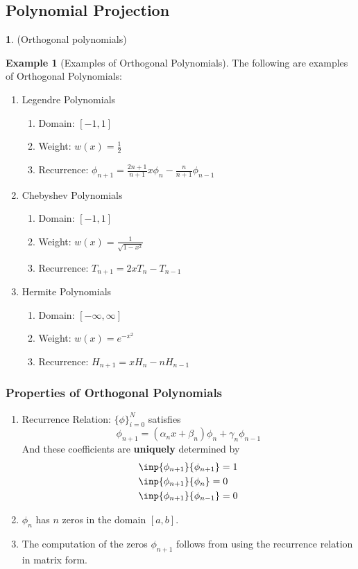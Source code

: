 \documentclass[12pt]{article}
\theoremstyle{definition}
\newtheorem{definition}{\color{NavyBlue}{\textbf{Definition}}}
\newtheorem{example}{\color{WildStrawberry}Example}
\theoremstyle{definition}
\begin{document}
\subsection{Polynomial Projection}

\begin{definition}(Orthogonal polynomials)
	
\end{definition}

\begin{example}[Examples of Orthogonal Polynomials]
The following are examples of Orthogonal Polynomials:
\begin{enumerate}
	\item Legendre Polynomials
	\begin{enumerate}
		\item Domain: $[-1,1]$
		\item Weight: $w(x) = \frac{1}{2}$
		\item Recurrence: $\phi_{n+1} = \frac{2n+1}{n+1}x\phi_n - \frac{n}{n+1}\phi_{n-1}$
	\end{enumerate}
	\item Chebyshev Polynomials
	\begin{enumerate}
		\item Domain: $[-1,1]$
		\item Weight: $w(x) = \frac{1}{\sqrt{1-x^2}}$
		\item Recurrence: $T_{n+1} = 2x T_n - T_{n-1}$
	\end{enumerate}
	\item Hermite Polynomials
	\begin{enumerate}
		\item Domain: $[-\infty,\infty]$
		\item Weight: $w(x) = e^{-x^2}$
		\item Recurrence: $H_{n+1} = xH_n - nH_{n-1}$
	\end{enumerate}
\end{enumerate}
\end{example}

\subsubsection{Properties of Orthogonal Polynomials}
\begin{enumerate}
	\item Recurrence Relation: $\{\phi\}_{i=0}^N$ satisfies
	\begin{equation}
		\phi_{n+1} = (\alpha_n x + \beta_n)\phi_n + \gamma_n \phi_{n-1}
	\end{equation}
	And these coefficients are \textbf{uniquely} determined by 
	\begin{align*}
		&\inp{\phi_{n+1}}{\phi_{n+1}} = 1 \\
		&\inp{\phi_{n+1}}{\phi_{n}} = 0 \\
		&\inp{\phi_{n+1}}{\phi_{n-1}} = 0
	\end{align*}
	\item $\phi_n$ has $n$ zeros in the domain $[a,b]$.
	\item The computation of the zeros $\phi_{n+1}$ follows from using the recurrence relation in matrix form. 
\end{enumerate}
\end{document}
